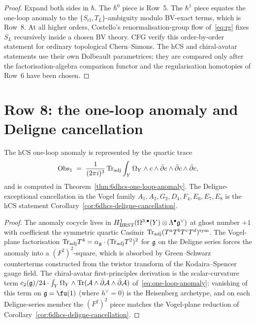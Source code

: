 \begin{proof}
Expand both sides in $\hbar$. The $\hbar^0$ piece is Row~5. The
$\hbar^1$ piece equates the one-loop anomaly to the
$\{S_{\mathrm{cl}},T_L\}$-ambiguity modulo BV-exact terms, which is
Row~8. At all higher orders, Costello's renormalisation-group flow
of~\eqref{eq:rg} fixes $S_L$ recursively inside a chosen BV theory. CFG
verify this order-by-order statement for ordinary topological
Chern--Simons. The hCS and chiral-avatar statements use their own
Dolbeault parametrices; they are compared only after the
factorisation-algebra comparison functor and the regularisation
homotopies of Row~6 have been chosen.
\end{proof}

\section{Row 8: the one-loop anomaly and Deligne cancellation}
\label{sec:cfg-row-8-anomaly}

\begin{theorem}
\label{thm:cfg-row-8}
The hCS one-loop anomaly is represented by the quartic trace
\[
 \mathrm{Obs}_1
 \;=\;
 \frac{1}{(2\pi i)^3}\,\mathrm{Tr}_{\mathrm{adj}}
 \int_Y\Omega_Y\wedge c\wedge\bar\partial c\wedge\bar\partial c\wedge\bar\partial c,
\]
and is computed in Theorem~\ref{thm:6dhcs-one-loop-anomaly}. The Deligne-exceptional
cancellation in the Vogel family
$A_1, A_2, G_2, D_4, F_4, E_6, E_7, E_8$ is the hCS statement
Corollary~\ref{cor:6dhcs-deligne-cancellation}.
\end{theorem}

\begin{proof}
The anomaly cocycle lives in $H^1_{\mathrm{BRST}}(\Omega^{3,\bullet}(Y)\otimes
\Lambda^\bullet\mathfrak{g}^\vee)$ at ghost number $+1$ with coefficient the
symmetric quartic Casimir
$\mathrm{Tr}_{\mathrm{adj}}(T^a T^b T^c T^d)^{\mathrm{sym}}$. The Vogel-plane
factorisation
$\mathrm{Tr}_{\mathrm{adj}}T^4 = \alpha_{\mathfrak{g}}\cdot(\mathrm{Tr}_{\mathrm{adj}}T^2)^2$ for
$\mathfrak{g}$ on the Deligne series forces the anomaly into a
$(F^2)^2$-square, which is absorbed by Green--Schwarz counterterms
constructed from the twistor transform of the
Kodaira--Spencer gauge field. The chiral-avatar first-principles
derivation is the scalar-curvature term
$c_2(\mathfrak{g})/24\cdot\int_Y\Omega_Y\wedge \mathrm{Tr}(\mathcal{A}\wedge\bar\partial\mathcal{A}\wedge\bar\partial\mathcal{A})$
of~\eqref{eq:one-loop-anomaly}: vanishing of this term on
$\fg = \fu(1)$ (where $h^\vee = 0$) is the Heisenberg
archetype, and on each Deligne-series member the $(F^2)^2$ piece
matches the Vogel-plane reduction of
Corollary~\ref{cor:6dhcs-deligne-cancellation}.
\end{proof}

